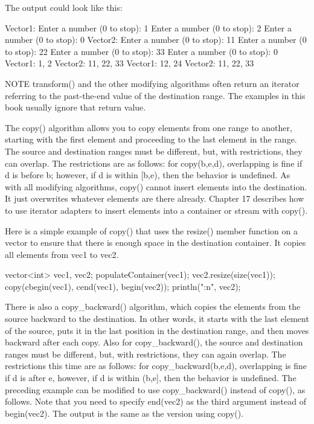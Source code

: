 The output could look like this:

\begin{shell}
Vector1:
Enter a number (0 to stop): 1
Enter a number (0 to stop): 2
Enter a number (0 to stop): 0
Vector2:
Enter a number (0 to stop): 11
Enter a number (0 to stop): 22
Enter a number (0 to stop): 33
Enter a number (0 to stop): 0
Vector1: 1, 2
Vector2: 11, 22, 33
Vector1: 12, 24
Vector2: 11, 22, 33
\end{shell}

\begin{myNotic}{NOTE}
transform() and the other modifying algorithms often return an iterator referring to the past-the-end value of the destination range. The examples in this book usually ignore that return value.
\end{myNotic}


The copy() algorithm allows you to copy elements from one range to another, starting with the first element and proceeding to the last element in the range. The source and destination ranges must be different, but, with restrictions, they can overlap. The restrictions are as follows: for copy(b,e,d), overlapping is fine if d is before b; however, if d is within [b,e), then the behavior is undefined. As with all modifying algorithms, copy() cannot insert elements into the destination. It just overwrites whatever elements are there already. Chapter 17 describes how to use iterator adapters to insert elements into a container or stream with copy().

Here is a simple example of copy() that uses the resize() member function on a vector to ensure that there is enough space in the destination container. It copies all elements from vec1 to vec2.

\begin{cpp}
vector<int> vec1, vec2;
populateContainer(vec1);
vec2.resize(size(vec1));
copy(cbegin(vec1), cend(vec1), begin(vec2));
println("{:n}", vec2);
\end{cpp}

There is also a copy\_backward() algorithm, which copies the elements from the source backward to the destination. In other words, it starts with the last element of the source, puts it in the last position in the destination range, and then moves backward after each copy. Also for copy\_backward(), the source and destination ranges must be different, but, with restrictions, they can again overlap. The restrictions this time are as follows: for copy\_backward(b,e,d), overlapping is fine if d is after e, however, if d is within (b,e], then the behavior is undefined. The preceding example can be modified to use copy\_backward() instead of copy(), as follows. Note that you need to specify end(vec2) as the third argument instead of begin(vec2). The output is the same as the version using copy().

